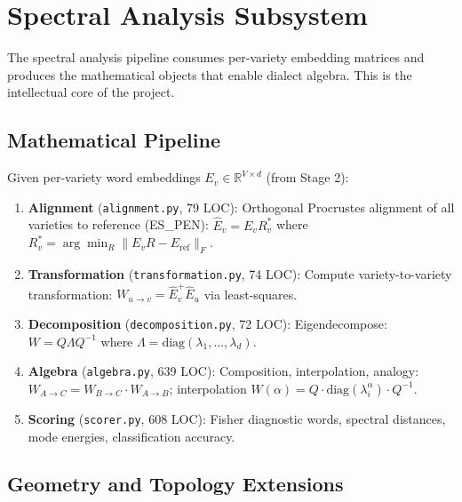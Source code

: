 \documentclass[11pt,a4paper]{article}
\begin{document}
\section{Spectral Analysis Subsystem}

The spectral analysis pipeline consumes per-variety embedding matrices and produces
the mathematical objects that enable dialect algebra. This is the intellectual core
of the project.

\subsection{Mathematical Pipeline}

Given per-variety word embeddings $E_v \in \mathbb{R}^{V \times d}$ (from Stage 2):

\begin{enumerate}[nosep]
  \item \textbf{Alignment} (\texttt{alignment.py}, 79 LOC): Orthogonal Procrustes
        alignment of all varieties to reference (ES\_PEN):
        $\hat{E}_v = E_v R_v^*$ where $R_v^* = \arg\min_R \|E_v R - E_{\text{ref}}\|_F$.

  \item \textbf{Transformation} (\texttt{transformation.py}, 74 LOC): Compute
        variety-to-variety transformation:
        $W_{u \to v} = \hat{E}_v^+ \hat{E}_u$ via least-squares.

  \item \textbf{Decomposition} (\texttt{decomposition.py}, 72 LOC): Eigendecompose:
        $W = Q \Lambda Q^{-1}$ where $\Lambda = \text{diag}(\lambda_1, \ldots, \lambda_d)$.

  \item \textbf{Algebra} (\texttt{algebra.py}, 639 LOC): Composition, interpolation,
        analogy: $W_{A \to C} = W_{B \to C} \cdot W_{A \to B}$; interpolation
        $W(\alpha) = Q \cdot \text{diag}(\lambda_i^\alpha) \cdot Q^{-1}$.

  \item \textbf{Scoring} (\texttt{scorer.py}, 608 LOC): Fisher diagnostic words,
        spectral distances, mode energies, classification accuracy.
\end{enumerate}

\subsection{Geometry and Topology Extensions}
\end{document}
